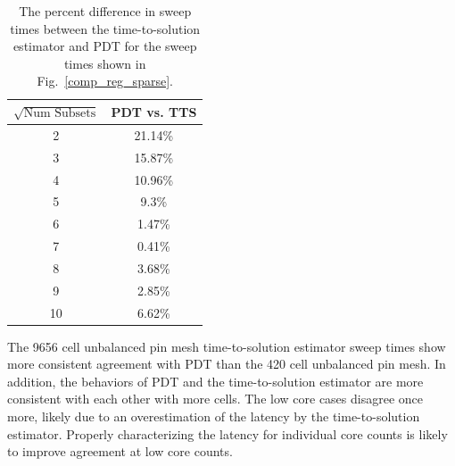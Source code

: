 \begin{table}[h]
\centering
\caption{The percent difference in sweep times between the time-to-solution estimator and PDT for the sweep times shown in Fig.~\ref{comp_reg_sparse}.}
\label{diff_reg_sparse}
\begin{tabular}{c|c}
\textbf{$\sqrt{\text{Num Subsets}}$} & \bf PDT vs. TTS \\ \hline 
2&21.14\%\\ \hline 
3&15.87\%\\ \hline 
4&10.96\%\\ \hline 
5&9.3\%\\ \hline 
6&1.47\%\\ \hline 
7&0.41\%\\ \hline 
8&3.68\%\\ \hline 
9&2.85\%\\ \hline 
10&6.62\%
\end{tabular}
\end{table}

The 9656 cell unbalanced pin mesh time-to-solution estimator sweep times show more consistent agreement with PDT than the 420 cell unbalanced pin mesh.
In addition, the behaviors of PDT and the time-to-solution estimator are more consistent with each other with more cells.
The low core cases disagree once more, likely due to an overestimation of the latency by the time-to-solution estimator.
Properly characterizing the latency for individual core counts is likely to improve agreement at low core counts. 

\FloatBarrier
